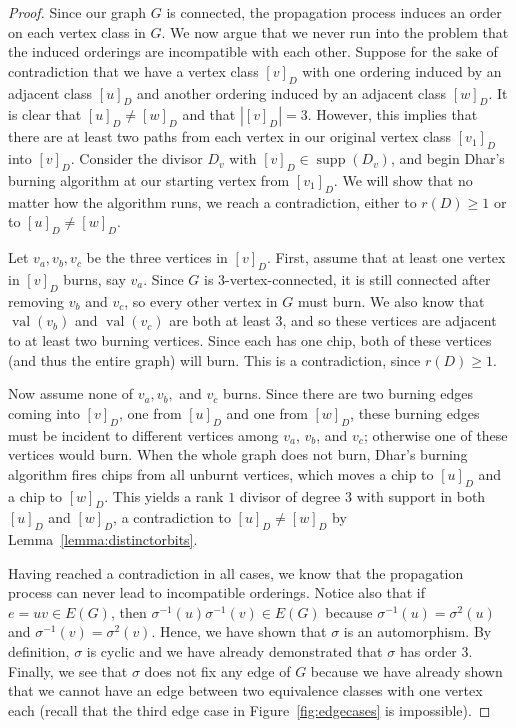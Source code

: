 \documentclass[ALCO,ThmDefs,Unicode,epreuves]{cedram}
\DeclareMathOperator{\val}{val}
\DeclareMathOperator{\supp}{supp}
\begin{document}
\begin{proof}
Since our graph $G$ is connected, the propagation process induces an order on each vertex class in $G$. We now argue that we never run into the problem that the induced orderings are incompatible with each other. Suppose for the sake of contradiction that we have a vertex class $[v]_D$ with one ordering induced by an adjacent class $[u]_D$ and another ordering induced by an adjacent class $[w]_D$. It is clear that $[u]_D \neq [w]_D$ and that $| [v]_D | = 3$. However, this implies that there are at least two paths from each vertex in our original vertex class $[v_1]_D$ into $[v]_D$. Consider the divisor $D_{v}$ with $[v]_D \in \supp (D_v)$, and begin Dhar's burning algorithm at our starting vertex from $[v_1]_D$. We will show that no matter how the algorithm runs, we reach a contradiction, either to $r(D)\geq 1$ or to $[u]_D\neq [w]_D$.

Let $v_a,v_b,v_c$ be the three vertices in $[v]_D$. First, assume that at least one vertex in $[v]_D$ burns, say $v_a$. Since $G$ is $3$-vertex-connected, it is still connected after removing $v_b$ and $v_c$, so every other vertex in $G$ must burn. We also know that $\val(v_b)$ and $\val(v_c)$ are both at least $3$, and so these vertices are adjacent to at least two burning vertices. Since each has one chip, both of these vertices (and thus the entire graph) will burn. This is a contradiction, since $r(D)\geq 1$.

Now assume none of $v_a,v_b,$ and $v_c$ burns. Since there are two burning edges coming into $[v]_D$, one from $[u]_D$ and one from $[w]_D$, these burning edges must be incident to different vertices among $v_a$, $v_b$, and $v_c$; otherwise one of these vertices would burn. When the whole graph does not burn, Dhar's burning algorithm fires chips from all unburnt vertices, which moves a chip to $[u]_D$ and a chip to $[w]_D$. This yields a rank $1$ divisor of degree $3$ with support in both $[u]_D$ and $[w]_D$, a contradiction to $[u]_D\neq [w]_D$ by Lemma~\ref{lemma:distinctorbits}.

Having reached a contradiction in all cases, we know that the propagation process can never lead to incompatible orderings. Notice also that if $e = uv \in E(G)$, then $\sigma^{-1}(u)\sigma^{-1}(v) \in E(G)$ because $\sigma^{-1}(u) = \sigma^2(u)$ and $\sigma^{-1}(v) = \sigma^2(v)$. Hence, we have shown that $\sigma$ is an automorphism. By definition, $\sigma$ is cyclic and we have already demonstrated that $\sigma$ has order $3$. Finally, we see that $\sigma$ does not fix any edge of $G$ because we have already shown that we cannot have an edge between two equivalence classes with one vertex each (recall that the third edge case in Figure~\ref{fig:edgecases} is impossible).
\end{proof}
\end{document}
